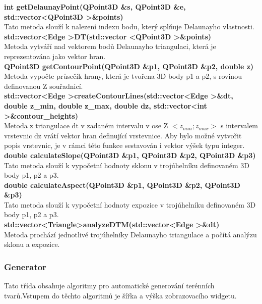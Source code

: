 \documentclass[a4paper,11pt,twoside]{article}
\begin{document}
\newpage
\noindent\textbf{int getDelaunayPoint(QPoint3D \&s, QPoint3D \&e, std::vector\textless QPoint3D \textgreater \&points)}\\
Tato metoda slouží k nalezení indexu bodu, který splňuje Delaunayho vlastnosti.\\

\noindent\textbf{std::vector\textless Edge \textgreater DT(std::vector \textless QPoint3D \textgreater \&points)}\\
Metoda vytváří nad vektorem bodů Delaunayho triangulaci, která je reprezentována jako vektor hran.\\

\noindent\textbf{QPoint3D getContourPoint(QPoint3D \&p1, QPoint3D \&p2, double z)}\\
Metoda vypočte průsečík hrany, která je tvořena 3D body p1 a p2, s rovinou definovanou Z souřadnicí.\\

\noindent\textbf{std::vector\textless Edge \textgreater createContourLines(std::vector\textless Edge \textgreater \&dt, double z\_min, double z\_max, double dz, std::vector\textless int \textgreater \&contour\_heights)}\\
Metoda z triangulace dt v zadaném intervalu v ose Z $<z_{min} ; z_{max}>$ s intervalem vrstevnic dz vrátí vektor hran definující vrstevnice. Aby bylo možné vytvořit popis vrstevnic, je v rámci této funkce sestavován i vektor výšek typu integer. \\

\noindent\textbf{double calculateSlope(QPoint3D \&p1, QPoint3D \&p2, QPoint3D \&p3)}\\
Tato metoda slouží k vypočetní hodnoty sklonu v trojúhelníku definovaném 3D body p1, p2 a p3.\\

\noindent\textbf{double calculateAspect(QPoint3D \&p1, QPoint3D \&p2, QPoint3D \&p3)}\\
Tato metoda slouží k vypočetní hodnoty expozice v trojúhelníku definovaném 3D body p1, p2 a p3.\\

\noindent\textbf{std::vector\textless Triangle\textgreater analyzeDTM(std::vector\textless Edge \textgreater \&dt)}\\
Metoda prochází jednotlivé trojúhelníky Delaunayho triangulace a počítá analýzu sklonu a expozice. \\

\newpage
\vspace*{-1cm}
\subsubsection{Generator}
Tato třída obsahuje algoritmy pro automatické generování terénních tvarů.Vstupem do těchto algoritmů je šířka a výška zobrazovacího widgetu.\\
\end{document}
